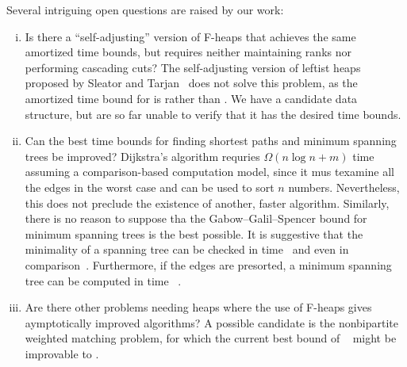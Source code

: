 Several intriguing open questions are raised by our work:
\begin{enumerate}[(i)][3]
    \item Is there a ``self-adjusting'' version of F-heaps that achieves the same
        amortized time bounds, but requires neither maintaining ranks nor performing
        cascading cuts? The self-adjusting version of leftist heaps proposed by
        Sleator and Tarjan~\cite{SleatorTarjan1986} does not solve this problem, as
        the amortized time bound for  is  rather than
        . We have a candidate data structure, but are so far unable to verify
        that it has the desired time bounds.
    \item Can the best time bounds for finding shortest paths and minimum spanning
        trees be improved? Dijkstra's algorithm requries \(\Omega(n \log n + m)\)
        time assuming a comparison-based computation model, since it mus texamine all
        the edges in the worst case and can be used to sort \(n\) numbers.
        Nevertheless, this does not preclude the existence of another, faster
        algorithm. Similarly, there is no reason to suppose tha the
        Gabow--Galil--Spencer bound for minimum spanning trees is the best possible.
        It is suggestive that the minimality of a spanning tree can be checked in
         time~\cite{Tarjan1979b} and even in 
        comparison~\cite{Komlos1984}. Furthermore, if the edges are presorted,
        a minimum spanning tree can be computed in  time~%
        \cite{Tarjan1983}.
    \item Are there other problems needing heaps where the use of F-heaps gives
        aymptotically improved algorithms? A possible candidate is the nonbipartite
        weighted matching problem, for which the current best bound of ~\cite{Gabow+1984} might be improvable
        to .
\end{enumerate}

